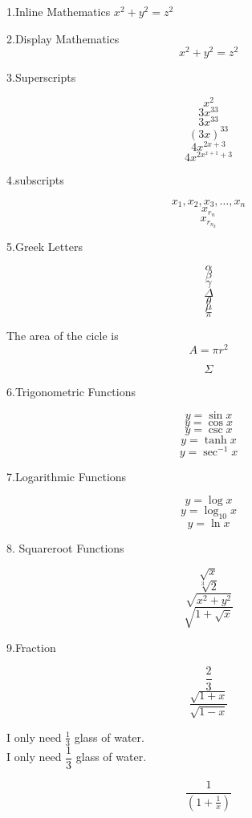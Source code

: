 \documentclass[11pt]{article}
\begin{document}
1.Inline Mathematics        
\(x^2 + y^2 = z^2\)

2.Display Mathematics
\[
x^2 + y^2 = z^2
\]

3.Superscripts

$$ x^2 $$
$$ 3x^33 $$
$$ 3x^{33} $$
$$ (3x)^{33} $$
$$ 4x^{2x+3} $$
$$ 4x^{2x^{x+1}+3} $$

4.subscripts

$$ x_1,x_2,x_3, \ldots ,x_n $$
$$ x_{r_n} $$
$$ x_{r_{n_k}} $$

5.Greek Letters

$$ \alpha $$
$$ \beta $$
$$ \gamma $$
$$ \Delta $$
$$ \theta $$
$$ \mu $$
$$ \pi $$

The area of the cicle is
$$ A = \pi r^2 $$

$$ \Sigma $$

6.Trigonometric Functions

$$ y = \sin x $$
$$ y = \cos x $$
$$ y = \csc x $$
$$ y = \tanh x $$
$$ y = \sec^{-1} x $$

7.Logarithmic Functions

$$ y = \log x $$ 
$$ y = \log_{10} x $$ 
$$ y = \ln x $$ 

8. Squareroot Functions

$$ \sqrt{x} $$
$$ \sqrt[3]{2} $$ %
$$ \sqrt{x^2 + y^2} $$
$$ \sqrt{1 + \sqrt{x}} $$

9.Fraction

$$ \frac{2}{3} $$
$$ \frac{\sqrt{1+x}}{\sqrt{1-x}} $$

I only need $\frac{1}{3}$ glass of water.\\[6pt]
I only need $\dfrac{1}{3}$ glass of water.

$$ \frac{1}{  (1 + \frac{1}{x})    } $$
\end{document}
